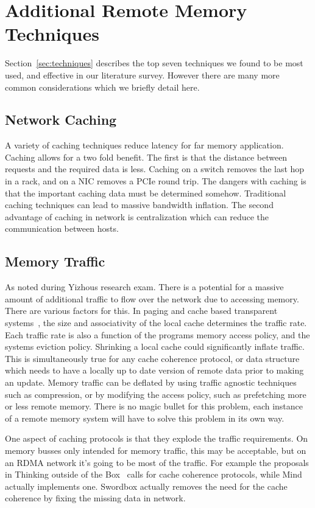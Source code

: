 \section{Additional Remote Memory Techniques}
\label{sec:additional}

Section~\ref{sec:techniques} describes the top seven techniques we found to be
most used, and effective in our literature survey. However there are many more
common considerations which we briefly detail here.

\subsection{Network Caching} A variety of caching techniques reduce latency for far memory
application. Caching allows for a two fold benefit. The first is that the
distance between requests and the required data is less. Caching on a switch
removes the last hop in a rack, and on a NIC removes a PCIe round trip. The
dangers with caching is that the important caching data must be determined
somehow. Traditional caching techniques can lead to massive bandwidth inflation.
The second advantage of caching in network is centralization which can reduce
the communication between hosts.

\subsection{Memory Traffic} As noted during Yizhous research exam. There is a
potential for a massive amount of additional traffic to flow over the network
due to accessing memory. There are various factors for this. In paging and cache
based transparent systems~\cite{fastswap,kona,gms,infiniswap,legoos,lite}, the
size and associativity of the local cache determines the traffic rate. Each
traffic rate is also a function of the programs memory access policy, and the
systems eviction policy. Shrinking a local cache could significantly inflate
traffic. This is simultaneously true for any cache coherence protocol, or data
structure which needs to have a locally up to date version of remote data prior
to making an update. Memory traffic can be deflated by using traffic agnostic
techniques such as compression, or by modifying the access policy, such as
prefetching more or less remote memory. There is no magic bullet for this
problem, each instance of a remote memory system will have to solve this problem
in its own way.

One aspect of caching protocols is that they explode the traffic requirements.
On memory busses only intended for memory traffic, this may be acceptable, but
on an RDMA network it's going to be most of the traffic. For example the
proposals in Thinking outside of the Box~\cite{design-far-memory-struct} calls
for cache coherence protocols, while Mind~\cite{mind} actually implements one.
Swordbox actually removes the need for the cache coherence by fixing the missing
data in network.

